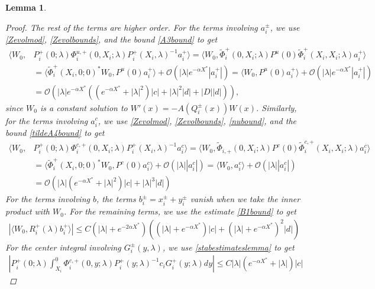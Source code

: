 \documentclass[10pt,reqno]{amsart}
\theoremstyle{plain}
\newtheorem{lemma}[theorem]{Lemma}
\theoremstyle{definition}
\theoremstyle{remark}
\numberwithin{theorem}{section}
\numberwithin{equation}{section}
\begin{document}
\begin{lemma}
\begin{proof}
The rest of the terms are higher order. For the terms involving $a_i^\pm$, we use \cref{Zevolmod}, \cref{Zevolbounds}, and the bound \cref{A3bound} to get
\begin{align*}
\langle W_0, &P_i^+(0; \lambda) \Phi_i^{u,+}(0, X_i; \lambda) P_i^+(X_i, \lambda)^{-1} a_i^+ \rangle = \langle W_0, \tilde{\Phi}_i^+(0, X_i; \lambda) 
P^u(0) \tilde{\Phi}_i^+(X_i, X_i; \lambda)a_i^+ \rangle \\
&= \langle \tilde{\Phi}_i^+(X_i, 0; 0)^* W_0, P^u(0) a_i^+ \rangle + \mathcal{O}(|\lambda|e^{-\alpha X^*}|a_i^+|) = \langle W_0, P^u(0) a_i^+ \rangle + \mathcal{O}(|\lambda|e^{-\alpha X^*}|a_i^+|) \\
&= \mathcal{O}\left(|\lambda|e^{-\alpha X^*} \left( (e^{-\alpha X^*} + |\lambda|^2) |c| + |\lambda|^2 |d| + |D||d| \right) \right),
\end{align*}
since $W_0$ is a constant solution to $W'(x) = -A(Q_i^\pm(x)) W(x)$. Similarly, for the terms involving $a_i^c$, we use \cref{Zevolmod}, \cref{Zevolbounds}, \cref{nubound}, and the bound \cref{tildeA4bound}
 to get
\begin{align*}
\langle W_0, &P_i^+(0; \lambda) \Phi_i^{c,+}(0, X_i; \lambda) P_i^+(X_i, \lambda)^{-1} a_i^c \rangle = \langle W_0, \tilde{\Phi}_{i,+}(0, X_i; \lambda) 
P^c(0) \tilde{\Phi}_i^{c,+}(X_i, X_i; \lambda)a_i^c \rangle \\
&= \langle \tilde{\Phi}_i^+(X_i, 0; 0)^* W_0, P^c(0) a_i^c \rangle + \mathcal{O}(|\lambda||a_i^c|) = \langle W_0, a_i^c \rangle + \mathcal{O}(|\lambda||a_i^c|) \\
&= \mathcal{O}\left( |\lambda| (e^{-\alpha X^*} + |\lambda|^2) |c| +|\lambda|^3 |d| \right)
\end{align*}
For the terms involving $b$, the terms $b_i^\pm = x_i^\pm + y_i^\pm$ vanish when we take the inner product with $W_0$. For the remaining terms, we use the estimate \cref{B1bound} to get
\begin{align*}
|\langle W_0, R_i^+(\lambda) b_i^+ \rangle |\leq C \left(|\lambda| + e^{-2 \alpha X^*}\right)\left((|\lambda|+e^{-\alpha X^*})|c| + (|\lambda| + e^{-\alpha X^*})^2 |d| \right)
\end{align*}
For the center integral involving $G_i^\pm(y, \lambda)$, we use \cref{stabestimateslemma} to get
\begin{align*}
\left| P_i^+(0; \lambda) \int_{X_i}^0 \Phi_i^{c,+}(0, y; \lambda) P_i^+(y; \lambda)^{-1} c_i G_i^+(y; \lambda)  dy \right| \leq C |\lambda| (e^{-\alpha X^*} + |\lambda|) |c|
\end{align*}

\end{proof}
\end{lemma}
\end{document}
